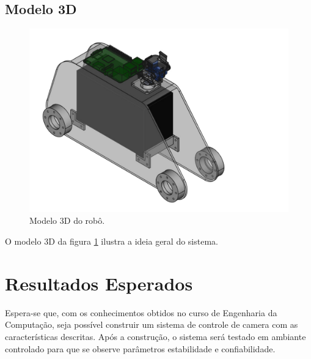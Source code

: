 \documentclass[12pt,a4paper]{article}
\begin{document}
\subsection{Modelo 3D}
\begin{figure}[H]
	\centering
	\includegraphics[scale=0.65]{modelo} 
	\caption{Modelo 3D do robô.}
	\label{fig:modelo3d}
\end{figure}
	O modelo 3D da figura \ref{fig:modelo3d} ilustra a ideia geral do sistema.

\section{Resultados Esperados}
	Espera-se que, com os conhecimentos obtidos no curso de Engenharia da Computação, seja possível construir um sistema de controle de camera com as características descritas. Após a construção, o sistema será testado em ambiante controlado para que se observe parâmetros estabilidade e confiabilidade.



\nocite{*}


\end{document}
